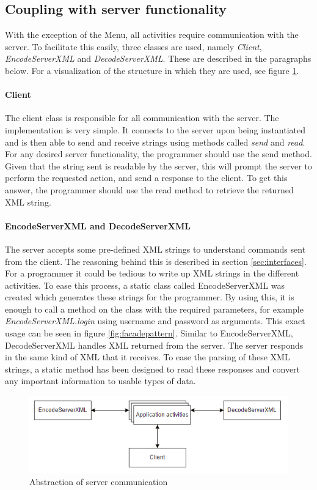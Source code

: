 \subsection{Coupling with server functionality}
\label{subsec:server-coupling}
With the exception of the Menu, all activities require communication with the server. To facilitate this easily, three classes are used, namely \textit{Client}, \textit{EncodeServerXML} and \textit{DecodeServerXML}. These are described in the paragraphs below. For a visualization of the structure in which they are used, see figure \ref{fig:appcommunication}.

\paragraph{Client}
The client class is responsible for all communication with the server. The implementation is very simple. It connects to the server upon being instantiated and is then able to send and receive strings using methods called \textit{send} and \textit{read}. For any desired server functionality, the programmer should use the send method. Given that the string sent is readable by the server, this will prompt the server to perform the requested action, and send a response to the client. To get this answer, the programmer should use the read method to retrieve the returned XML string.

\paragraph{EncodeServerXML and DecodeServerXML}
The server accepts some pre-defined XML strings to understand commands sent from the client. The reasoning behind this is described in section \ref{sec:interfaces}. For a programmer it could be tedious to write up XML strings in the different activities. To ease this process, a static class called EncodeServerXML was created which generates these strings for the programmer. By using this, it is enough to call a method on the class with the required parameters, for example \textit{EncodeServerXML.login} using username and password as arguments. This exact usage can be seen in figure \ref{fig:facadepattern}. Similar to EncodeServerXML, DecodeServerXML handles XML returned from the server. The server responds in the same kind of XML that it receives. To ease the parsing of these XML strings, a static method has been designed to read these responses and convert any important information to usable types of data.

\begin{figure}[H]
\centering
\includegraphics[width=\textwidth]{billeder/appcommunication.png}
\caption{Abstraction of server communication}
\label{fig:appcommunication}
\end{figure}